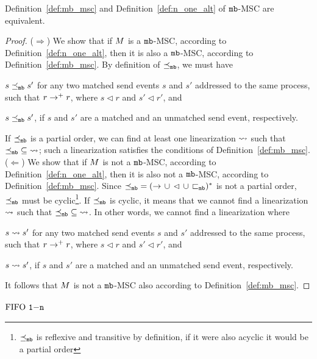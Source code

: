 \begin{proposition}
    Definition~\ref{def:mb_msc} and Definition~\ref{def:n_one_alt} of $\mathtt{mb}$-MSC are equivalent.
\end{proposition}
\begin{proof}
    ($\Rightarrow$)  We show that if $M$ is a $\mathtt{mb}$-MSC, according to Definition~\ref{def:n_one_alt}, then it is also a $\mathtt{mb}$-MSC, according to Definition~\ref{def:mb_msc}. By definition of $\preceq_{\mathtt{mb}}$, we must have 
    \begin{enumerate*}[label={(\roman*)}]
        \item $s \preceq_{\mathtt{mb}} s'$ for any two matched send events $s$ and $s'$ addressed to the same process, such that $r \to^+ r$, where $s \lhd r$ and $s' \lhd r'$, and
        \item $s \preceq_{\mathtt{mb}} s'$, if $s$ and $s'$ are a matched and an unmatched send event, respectively.
    \end{enumerate*} 
    If $\preceq_{\mathtt{mb}}$ is a partial order, we can find at least one linearization $\rightsquigarrow$ such that $\preceq_{\mathtt{mb}} \;\subseteq\; \rightsquigarrow$; such a linearization satisfies the conditions of Definition~\ref{def:mb_msc}.\newline
    ($\Leftarrow$) We show that if $M$ is not a $\mathtt{mb}$-MSC, according to Definition~\ref{def:n_one_alt}, then it is also not a $\mathtt{mb}$-MSC, according to Definition~\ref{def:mb_msc}. Since ${\preceq_{\mathtt{mb}}} = ({\to} \,\cup\, {\lhd} \,\cup\, {\sqsubset_{\mathtt{mb}}})^\ast$ is not a partial order, $\preceq_{\mathtt{mb}}$ must be cyclic\footnote{$\preceq_{\mathtt{mb}}$ is reflexive and transitive by definition, if it were also acyclic it would be a partial order}. If $\preceq_{\mathtt{mb}}$ is cyclic, it means that we cannot find a linearization $\rightsquigarrow$ such that $\preceq_{\mathtt{mb}} \;\subseteq\; \rightsquigarrow$. In other words, we cannot find a linearization where      
    \begin{enumerate*}[label={(\roman*)}]
        \item $s \rightsquigarrow s'$ for any two matched send events $s$ and $s'$ addressed to the same process, such that $r \to^+ r$, where $s \lhd r$ and $s' \lhd r'$, and
        \item $s \rightsquigarrow s'$, if $s$ and $s'$ are a matched and an unmatched send event, respectively.
    \end{enumerate*} 
    It follows that $M$ is not a $\mathtt{mb}$-MSC also according to Definition~\ref{def:mb_msc}.
\end{proof}

\paragraph*{\bf $\text{FIFO } \mathtt{1\mathsf{-}n}$}

